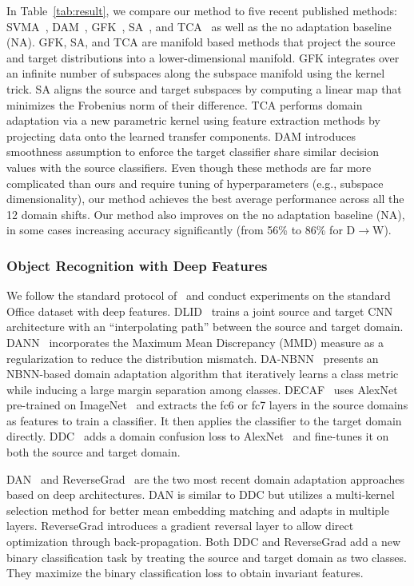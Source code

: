 \documentclass[letterpaper]{article}
\begin{document}
In Table~\ref{tab:result}, we compare our method to five recent published methods: SVMA~\cite{svma}, DAM~\cite{ref:duan09}, GFK~\cite{gfk}, SA~\cite{sasb}, and TCA~\cite{tca} as well as the no adaptation baseline (NA). GFK, SA, and TCA are manifold based methods that project the source and target distributions into a lower-dimensional manifold. GFK integrates over an infinite number of subspaces along the subspace manifold using the kernel trick. SA aligns the source and target subspaces by computing a linear map that minimizes the Frobenius norm of their difference. TCA performs domain adaptation via a new parametric kernel using feature extraction methods by projecting data onto the learned transfer components. DAM introduces smoothness assumption to enforce the target classifier share similar decision values with the source classifiers. Even though these methods are far more complicated than ours and require tuning of hyperparameters (e.g., subspace dimensionality), our method achieves the best average performance across all the 12 domain shifts. Our method also improves on the no adaptation baseline (NA), in some cases increasing accuracy significantly (from 56\% to 86\% for D$\rightarrow$W).

\subsubsection{Object Recognition with Deep Features}
We follow the standard protocol of~\cite{decaf,tzeng_arxiv15,dan_long15,reversegrad} and conduct experiments on the standard Office dataset with deep features. DLID~\cite{chopra2013dlid} trains a joint source and target CNN architecture with an ``interpolating path'' between the source and target domain. DANN~\cite{DANN} incorporates the Maximum Mean Discrepancy (MMD) measure as a regularization to reduce the distribution mismatch. DA-NBNN~\cite{da_nbnn} presents an NBNN-based domain adaptation algorithm that  iteratively learns a class metric while inducing a large margin separation among classes. DECAF~\cite{decaf} uses  AlexNet~\cite{alexnet} pre-trained on ImageNet~\cite{imagenet} and extracts the fc6 or fc7 layers in the source domains as features to train a classifier. It then applies the classifier to the target domain directly. DDC~\cite{tzeng_arxiv15} adds a domain confusion loss to AlexNet~\cite{alexnet} and fine-tunes it on both the source and target domain.

DAN~\cite{dan_long15} and ReverseGrad~\cite{reversegrad} are the two most recent domain adaptation approaches based on deep architectures. DAN is similar to DDC but utilizes a multi-kernel selection method for better mean embedding matching and adapts in multiple layers. ReverseGrad introduces a gradient reversal layer to allow direct optimization through back-propagation. Both DDC and ReverseGrad add a new binary classification task by treating the source and target domain as two classes. They maximize the binary classification loss to obtain invariant features.
\end{document}
